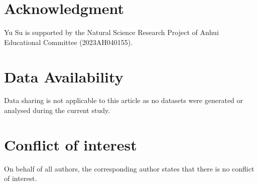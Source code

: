 \documentclass[12pt,a4paper,reqno]{amsart}
\numberwithin{equation}{section}
\begin{document}
\section*{Acknowledgment}
Yu Su is supported by the Natural Science Research Project of Anhui Educational Committee (2023AH040155).

\section*{Data Availability}
Data sharing is not applicable to this article as no datasets were generated or analysed during the current study.

\section*{Conflict of interest}
On behalf of all authors,
the corresponding author states that there is no conflict of interest.
\end{document}
